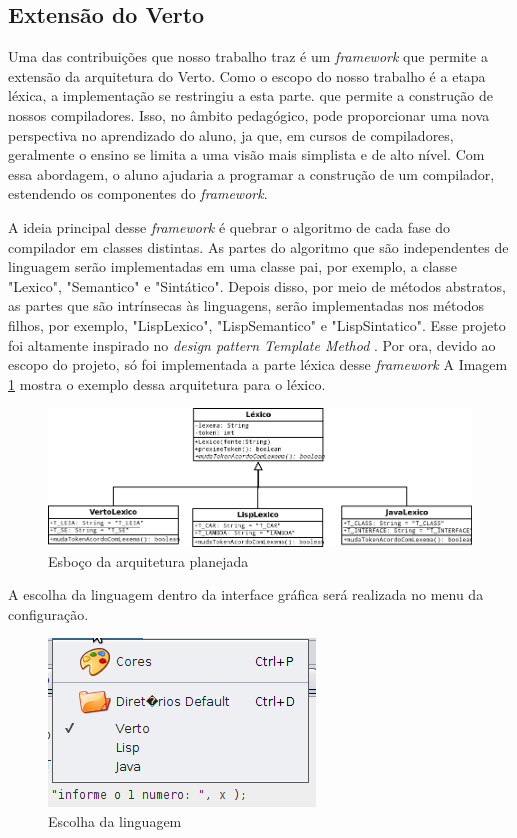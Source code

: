 \subsection{Extensão do Verto}
Uma das contribuições que nosso trabalho traz é um \emph{framework} que permite a extensão da arquitetura do Verto.
Como o escopo do nosso trabalho é a etapa léxica, a implementação se restringiu a esta parte.
que permite a construção de nossos compiladores.
Isso, no âmbito pedagógico, pode proporcionar uma nova perspectiva no aprendizado do aluno,
ja que, em cursos de compiladores, geralmente o ensino se limita a uma visão mais simplista e de alto nível.
Com essa abordagem, o aluno ajudaria a programar a construção de um compilador, estendendo os componentes do \emph{framework}.

A ideia principal desse \emph{framework} é quebrar o algoritmo de cada fase do compilador
em classes distintas.
As partes do algoritmo que são independentes de linguagem serão implementadas em uma classe pai, 
por exemplo, a classe "Lexico", "Semantico" e "Sintático". 
Depois disso, por meio de métodos abstratos, as partes que são intrínsecas às linguagens, serão implementadas
nos métodos filhos, por exemplo, "LispLexico", "LispSemantico" e "LispSintatico".
Esse projeto foi altamente inspirado no \emph{design pattern Template Method} \cite{gof}.
Por ora, devido ao escopo do projeto, só foi implementada a parte léxica desse \emph{framework}
A Imagem \ref{diagrama-classe}  mostra o exemplo dessa arquitetura para o léxico.
\begin{figure}[ht]
	\centering
	\includegraphics[scale=0.4]{imgs/diagrama-classe.png}
	\caption{Esboço da arquitetura planejada}
	\label{diagrama-classe}
\end{figure}

A escolha da linguagem dentro da interface gráfica será realizada no menu da configuração.
\begin{figure}[ht]
	\centering
	\includegraphics[scale=0.7]{imgs/escolha-linguagem.png}
	\caption{Escolha da linguagem}
	\label{escolha-linguagem}
\end{figure}

